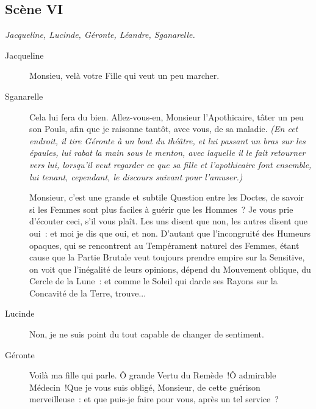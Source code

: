 \documentclass[french,twoside]{book} %
\begin{document}
\subsection[{Scène VI}]{Scène VI}
\label{III06}
\textit{Jacqueline, Lucinde, Géronte, Léandre, Sganarelle.}\par
 \begin{description} \item[Jacqueline] 

Monsieu, velà votre Fille qui veut un peu marcher.\end{description}
 \begin{description} \item[Sganarelle] 

Cela lui fera du bien. Allez-vous-en, Monsieur l’Apothicaire, tâter un peu son Pouls, afin que je raisonne tantôt, avec vous, de sa maladie.\textit{ (En cet endroit, il tire Géronte à un bout du théâtre, et lui passant un bras sur les épaules, lui rabat la main sous le menton, avec laquelle il le fait retourner vers lui, lorsqu’il veut regarder ce que sa fille et l’apothicaire font ensemble, lui tenant, cependant, le discours suivant pour l’amuser.) } 

Monsieur, c’est une grande et subtile Question entre les Doctes, de savoir si les Femmes sont plus faciles à guérir que les Hommes ? Je vous prie d’écouter ceci, s’il vous plaît. Les uns disent que non, les autres disent que oui : et moi je dis que oui, et non. D’autant que l’incongruité des Humeurs opaques, qui se rencontrent au Tempérament naturel des Femmes, étant cause que la Partie Brutale veut toujours prendre empire sur la Sensitive, on voit que l’inégalité de leurs opinions, dépend du Mouvement oblique, du Cercle de la Lune : et comme le Soleil qui darde ses Rayons sur la Concavité de la Terre, trouve...\end{description}
 \begin{description} \item[Lucinde] 

Non, je ne suis point du tout capable de changer de sentiment.\end{description}
 \begin{description} \item[Géronte] 

Voilà ma fille qui parle. Ô grande Vertu du Remède !Ô admirable Médecin !Que je vous suis obligé, Monsieur, de cette guérison merveilleuse : et que puis-je faire pour vous, après un tel service ?\end{description}
\end{document}
